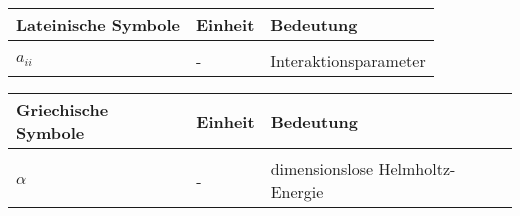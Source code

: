 \documentclass[../thesis.tex]{subfiles}
\begin{document}
	

\renewcommand*{\arraystretch}{1.2}
\small
\begin{tabular}{p{4cm}p{3cm}p{8cm}}
	Lateinische Symbole & Einheit & Bedeutung \\ 
	\hline \\[\dimexpr-\normalbaselineskip+2pt]
	$a_{ii}$ & - & Interaktionsparameter 
\end{tabular}
\vspace{1cm}

\small
\begin{tabular}{p{4cm}p{3cm}p{8cm}}
	Griechische Symbole & Einheit & Bedeutung \\
	\hline \\[\dimexpr-\normalbaselineskip+2pt] 
	$\alpha$ & - & dimensionslose Helmholtz-Energie \\
\end{tabular}

\listoffigures
\listoftables
\end{document}
